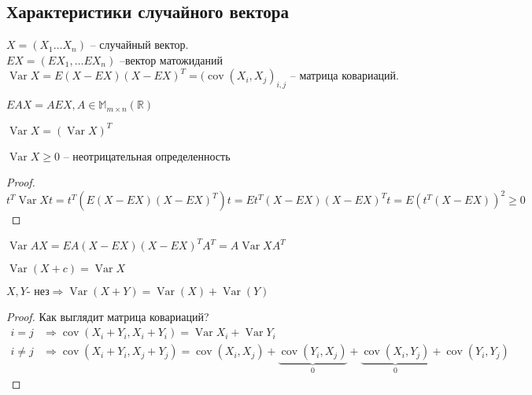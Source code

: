 \documentclass{article}
\DeclareMathOperator{\Var}{Var}
\DeclareMathOperator{\cov}{cov}
\begin{document}
    \subsection{Характеристики случайного вектора}
    \begin{definition}
        $X = (X_1 \dots X_n)$ -- случайный вектор.\\
        $EX = (EX_1, \dots EX_n) $ --вектор матожиданий \\ 
        $ \Var X = E(X-EX)(X-EX)^T  = (\cov(X_i, X_j)_{i, j}$ -- матрица ковариаций.
    \end{definition}
    \begin{property}
        $EAX = AEX, A \in \mathbb{M}_{m\times n} (\mathbb{R})$ \\
    \end{property}
    \begin{property}
        $\Var X = (\Var X) ^T$
    \end{property}
    \begin{property}
        $\Var X \ge 0$ -- неотрицательная определенность
        \begin{proof}
            $$ t^T \Var X t = t^T (E(X-EX)(X-EX)^T) t = Et^T (X-EX)(X-EX)^T t = E (t^T (X-EX))^2 \ge 0$$
        \end{proof}
    \end{property}
    \begin{property}
        $\Var AX = EA(X-EX)(X-EX)^TA^T = A \Var X A^T$
    \end{property}
    \begin{property}
        $\Var (X + c) = \Var X$
    \end{property}
    \begin{property}
        $X, Y \text{- нез} \Rightarrow \Var(X+Y) = \Var(X) + \Var(Y)$
        \begin{proof}
            Как выглядит матрица ковариаций? 
        \begin{align*}
        i = j &\Rightarrow \cov (X_i + Y_i, X_i + Y_i) = \Var X_i + \Var Y_i \\
        i \ne j &\Rightarrow \cov (X_i + Y_i, X_j + Y_j) = \cov(X_i, X_j) + \underbrace{\cov(Y_i, X_j)}_0 + \underbrace{\cov(X_i, Y_j)}_0 + \cov (Y_i, Y_j)
        \end{align*}
        \end{proof}
    \end{property}
\end{document}
